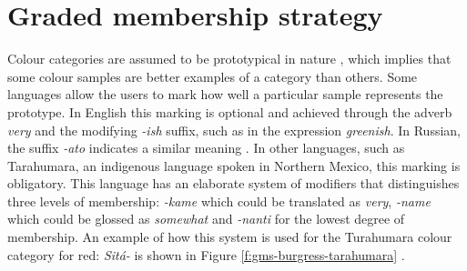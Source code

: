\chapter{Graded membership strategy}
\label{s:graded-membership-strategy}

Colour categories are assumed to be prototypical in nature
\citep{rosch73natural}, which implies that some colour samples are
better examples of a category than others. Some languages allow the
users to mark how well a particular sample represents the
prototype. In English this marking is optional and achieved through
the adverb \textit{very} and the modifying \textit{-ish} suffix, such as in the
expression \textit{greenish}. In Russian, the suffix \textit{-ato} indicates a
similar meaning \citep{safuanova07russian}. In other languages, such
as Tarahumara, an indigenous language spoken in Northern Mexico, this
marking is obligatory. This language has an elaborate system of
modifiers that distinguishes three levels of membership: \textit{-kame}
which could be translated as \textit{very}, \textit{-name} which could be
glossed as \textit{somewhat} and \textit{-nanti} for the lowest degree of
membership. An example of how this system is used for the Turahumara
colour category for red: \textit{Sit\'a-} is shown in Figure
\ref{f:gms-burgress-tarahumara} \citep{burgress83tarahumara}.

